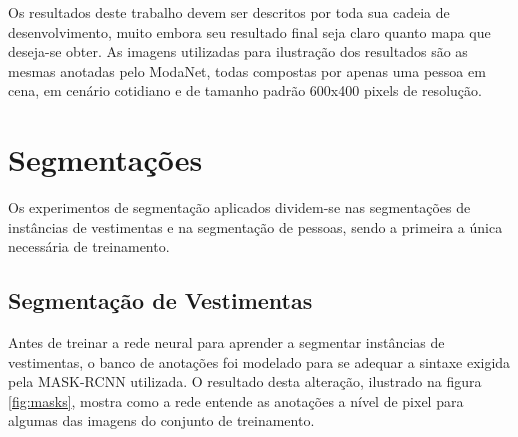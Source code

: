 \documentclass[12pt]{report}
\begin{document}
Os resultados deste trabalho devem ser descritos por toda sua cadeia de desenvolvimento, muito embora seu resultado final seja claro quanto mapa que deseja-se obter. As imagens utilizadas para ilustração dos resultados são as mesmas anotadas pelo ModaNet, todas compostas por apenas uma pessoa em cena, em cenário cotidiano e de tamanho padrão 600x400 pixels de resolução.

\section{Segmentações}


Os experimentos de segmentação aplicados dividem-se nas segmentações de instâncias de vestimentas e na segmentação de pessoas, sendo a primeira a única necessária de treinamento. 

\subsection{Segmentação de Vestimentas}

Antes de treinar a rede neural para aprender a segmentar instâncias de vestimentas, o banco de anotações foi modelado para se adequar a sintaxe exigida pela MASK-RCNN utilizada. O resultado desta alteração, ilustrado na figura \ref{fig:masks}, mostra como a rede entende as anotações a nível de pixel para algumas das imagens do conjunto de treinamento.
\end{document}

